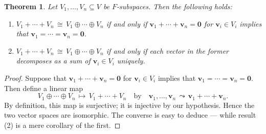 \documentclass[11pt]{article}
\newtheorem{theorem}{Theorem}
\renewcommand{\vec}[1]{\mathbf{#1}}
\begin{document}
\begin{adjustwidth}{0.5cm}{}
  \begin{theorem}
    Let $V_{1}, \ldots, V_{n} \subseteq V$ be $F$-subspaces. Then the following holds:
    \begin{enumerate}
      \item $V_{1} + \cdots + V_{n} \, \cong \, V_{1} \oplus \cdots \oplus V_{n}$ if and only if $\vec{v}_{1} + \cdots + \vec{v}_{n} = \vec{0}$ for $\vec{v}_{i} \in V_{i}$ implies that $\vec{v}_{1} = \cdots = \vec{v}_{n} = \vec{0}$.
      \item $V_{1} + \cdots + V_{n} \, \cong \, V_{1} \oplus \cdots \oplus V_{n}$ if and only if each vector in the former decomposes as a sum of $\vec{v}_{i} \in V_{i}$ uniquely.
    \end{enumerate} 
  \end{theorem}
  \begin{proof}
    Suppose that $\vec{v}_{1} + \cdots + \vec{v}_{n} = \vec{0}$ for $\vec{v}_{i} \in V_{i}$ implies that $\vec{v}_{1} = \cdots = \vec{v}_{n} = \vec{0}$. Then define a linear map
    \[
      V_{1} \oplus \cdots \oplus V_{n} \, \mapsto \, V_{1} + \cdots + V_{n} \quad \text{by} \quad \vec{v}_{1}, \ldots, \vec{v}_{n} \, \leadsto \, \vec{v}_{1} + \cdots + \vec{v}_{n}.
    \]
    By definition, this map is surjective; it is injective by our hypothesis. Hence the two vector spaces are isomorphic. The converse is easy to deduce --- while result (2) is a mere corollary of the first.
  \end{proof}
\end{adjustwidth}


\end{document}
